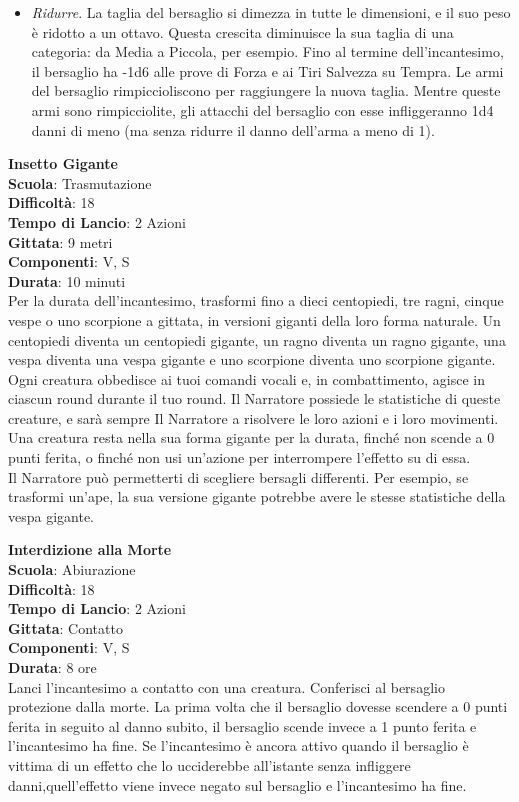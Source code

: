 \begin{multicols}{2}
\begin{itemize}
\item
\textit{Ridurre}. La taglia del bersaglio si dimezza in tutte le dimensioni, e il suo peso è ridotto a un ottavo. Questa crescita diminuisce la sua taglia di una categoria: da Media a Piccola, per esempio. Fino al termine dell'incantesimo, il bersaglio ha -1d6 alle prove di Forza e ai Tiri Salvezza su Tempra. Le armi del bersaglio rimpiccioliscono per raggiungere la nuova taglia. Mentre queste armi sono rimpicciolite, gli attacchi del bersaglio con esse infliggeranno 1d4 danni di meno (ma senza ridurre il danno dell'arma a meno di 1).
\end{itemize}

\medskip\textbf{Insetto Gigante}\\
\textbf{Scuola}: Trasmutazione\\
\textbf{Difficoltà}:  18\\
\textbf{Tempo di Lancio}: 2 Azioni\\
\textbf{Gittata}: 9 metri\\
\textbf{Componenti}: V, S\\
\textbf{Durata}: 10 minuti\\
Per la durata dell'incantesimo, trasformi fino a dieci centopiedi, tre ragni, cinque vespe o uno scorpione a gittata, in versioni giganti della loro forma naturale. Un centopiedi diventa un centopiedi gigante, un ragno diventa un ragno gigante, una vespa diventa una vespa gigante e uno scorpione diventa uno scorpione gigante. Ogni creatura obbedisce ai tuoi comandi vocali e, in combattimento, agisce in ciascun round durante il tuo round. Il Narratore possiede le statistiche di queste creature, e sarà sempre Il Narratore a risolvere le loro azioni e i loro movimenti. Una creatura resta nella sua forma gigante per la durata, finché non scende a 0 punti ferita, o finché non usi un'azione per interrompere l’effetto su di essa.\\
Il Narratore può permetterti di scegliere bersagli differenti. Per esempio, se trasformi un'ape, la sua versione gigante potrebbe avere le stesse statistiche della vespa gigante.

\medskip\textbf{Interdizione alla Morte}\\
\textbf{Scuola}: Abiurazione\\
\textbf{Difficoltà}:  18\\
\textbf{Tempo di Lancio}: 2 Azioni\\
\textbf{Gittata}: Contatto\\
\textbf{Componenti}: V, S\\
\textbf{Durata}: 8 ore\\
Lanci l'incantesimo a contatto con una creatura. Conferisci al bersaglio protezione dalla morte. La prima volta che il bersaglio dovesse scendere a 0 punti ferita in seguito al danno subito, il bersaglio scende invece a 1 punto ferita e l'incantesimo ha fine. Se l'incantesimo è ancora attivo quando il bersaglio è vittima di un effetto che lo ucciderebbe all'istante senza infliggere danni,quell'effetto viene invece negato sul bersaglio e l'incantesimo ha fine.


\end{multicols}
